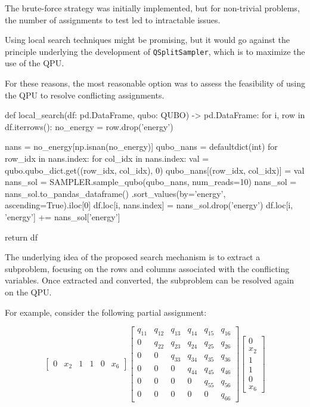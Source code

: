 The brute-force strategy was initially implemented, but for non-trivial problems, the number of assignments to test led to intractable issues.

Using local search techniques might be promising, but it would go against the principle underlying the development of \texttt{QSplitSampler}, which is to maximize the use of the QPU.

For these reasons, the most reasonable option was to assess the feasibility of using the QPU to resolve conflicting assignments.

\begin{python}
def local_search(df: pd.DataFrame, qubo: QUBO) -> pd.DataFrame:
    for i, row in df.iterrows():
        no_energy = row.drop('energy')

        nans = no_energy[np.isnan(no_energy)]
        qubo_nans = defaultdict(int)
        for row_idx in nans.index:
            for col_idx in nans.index:
                val = qubo.qubo_dict.get((row_idx, col_idx), 0)
                qubo_nans[(row_idx, col_idx)] = val
        nans_sol = SAMPLER.sample_qubo(qubo_nans, num_reads=10)
        nans_sol = nans_sol.to_pandas_dataframe()
                           .sort_values(by='energy', 
                                        ascending=True).iloc[0]
        df.loc[i, nans.index] = nans_sol.drop('energy')
        df.loc[i, 'energy'] += nans_sol['energy']

    return df
\end{python}

The underlying idea of the proposed search mechanism is to extract a subproblem, focusing on the rows and columns associated with the conflicting variables. 
Once extracted and converted, the subproblem can be resolved again on the QPU.

For example, consider the following partial assignment:

\begin{equation*}
    \begin{bmatrix}
        0 & x_2 & 1 & 1 & 0 & x_6
    \end{bmatrix}
    \begin{bmatrix}
        q_{11} & q_{12} & q_{13} & q_{14} & q_{15} & q_{16} \\
        0 & q_{22} & q_{23} & q_{24} & q_{25} & q_{26} \\
        0 & 0 & q_{33} & q_{34} & q_{35} & q_{36} \\
        0 & 0 & 0 & q_{44} & q_{45} & q_{46} \\
        0 & 0 & 0 & 0 & q_{55} & q_{56} \\
        0 & 0 & 0 & 0 & 0 & q_{66}
    \end{bmatrix}
    \begin{bmatrix}
        0 \\
        x_2 \\
        1 \\
        1 \\
        0 \\
        x_6
    \end{bmatrix}
\end{equation*}

